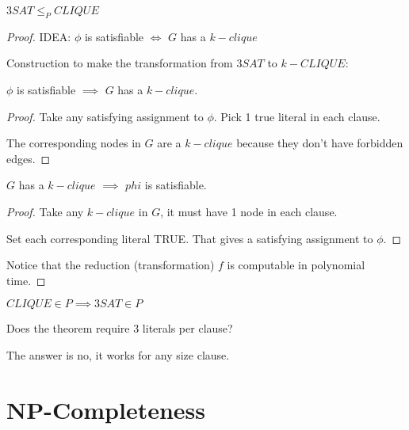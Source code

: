 \begin{theorem}
    \(3SAT \leq_P CLIQUE\) 
\end{theorem}
\begin{proof}
    IDEA: \(\phi\) is satisfiable \(\iff\) \(G\) has a \(k-clique\)        

    Construction to make the transformation from \(3SAT\) to \(k-CLIQUE\):
    \begin{remark}[Transformation]
    \end{remark}

    \begin{lemma}[Forward]
        \(\phi\) is satisfiable \(\implies\) \(G\) has a \(k-clique\).   
    \end{lemma}
    \begin{proof}
        Take any satisfying assignment to \(\phi\). Pick 1 true literal in each clause. 

        The corresponding nodes in \(G\) are a \(k-clique\) because they don't have forbidden edges.  
    \end{proof}

    \begin{lemma}[Backward]
        \(G\) has a \(k-clique\) \(\implies\) \(phi\) is satisfiable.
    \end{lemma}
    \begin{proof}
        Take any \(k-clique\) in \(G\), it must have 1 node in each clause.  

        Set each corresponding literal TRUE. That gives a satisfying assignment to \(\phi\). 
    \end{proof}

    Notice that the reduction (transformation) \(f\) is computable in polynomial time. 
\end{proof}

\begin{corollary}
    \(CLIQUE \in P \implies 3SAT \in P\) 
\end{corollary}

\begin{remark}
    Does the theorem require 3 literals per clause?

    The answer is no, it works for any size clause.
\end{remark}


\section{NP-Completeness}

